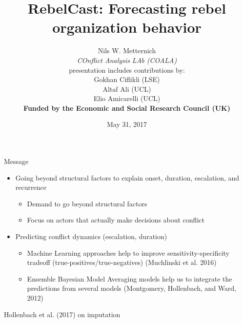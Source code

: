 \documentclass{beamer}
\begin{document}
\title[UCL]
{
RebelCast: Forecasting rebel organization behavior}
\author[EU JRC/EEAS workshop]
{
Nils W. Metternich\\
\footnotesize{\emph{COnflict Analysis LAb (COALA)}}\\
\tiny{presentation includes contributions by: \\
Gokhan Ciflikli (LSE)\\
Altaf Ali (UCL)\\
Elio Amicarelli (UCL)\\ [2ex]
} 
\textbf{Funded by the Economic and Social Research Council (UK)}}

\date{May 31, 2017}

\begin{frame}
\titlepage
\end{frame}

\begin{frame}{Message}
\begin{itemize}
\item Going beyond structural factors to explain onset, duration, escalation, and recurrence
\begin{itemize}
\item Demand to go beyond structural factors 
\item Focus on actors that actually make decisions about conflict
\end{itemize}
\item Predicting conflict dynamics (escalation, duration)
\begin{itemize}
\item Machine Learning approaches help to improve sensitivity-specificity tradeoff (true-positives/true-negatives) (Muchlinski et al. 2016)
\item Ensemble Bayesian Model Averaging models help us to integrate the predictions from several models (Montgomery, Hollenbach, and Ward, 2012)
\end{itemize}
\end{itemize}
\tiny{Hollenbach et al. (2017) on imputation}
\end{frame}
\end{document}
